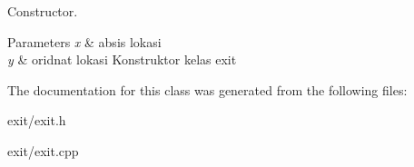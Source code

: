 Constructor. 


\begin{DoxyParams}{Parameters}
{\em x} & absis lokasi \\
\hline
{\em y} & oridnat lokasi Konstruktor kelas exit \\
\hline
\end{DoxyParams}


The documentation for this class was generated from the following files\+:\begin{DoxyCompactItemize}
\item 
exit/exit.\+h\item 
exit/exit.\+cpp\end{DoxyCompactItemize}
